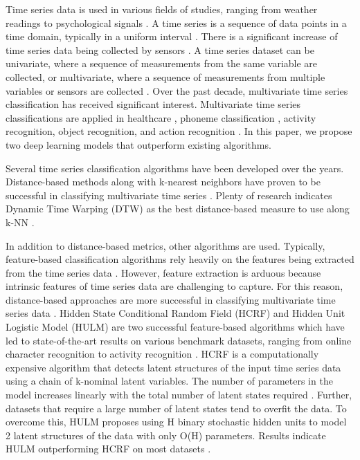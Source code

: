 \documentclass[preprint,12pt,3p]{elsarticle}
\begin{document}
Time series data is used in various fields of studies, ranging from weather readings to psychological signals \cite{kadous2002temporal,sharabiani2017efficient,kehagias1997predictive, cui2015complex}. A time series is a sequence of data points in a time domain, typically in a uniform interval \cite{wang2016effective}. There is a significant increase of time series data being collected by sensors \cite{spiegel2011pattern}. A time series dataset can be univariate, where a sequence of measurements from the same variable are collected, or multivariate, where a sequence of measurements from multiple variables or sensors are collected \cite{prieto2015stacking}. Over the past decade, multivariate time series classification has received significant interest. Multivariate time series classifications are applied in healthcare \cite{kang2014bayesian}, phoneme classification \cite{graves2005framewise}, activity recognition, object recognition, and action recognition \cite{fu2015human,geurts2001pattern,pavlovic1999time, yu2015real}. In this paper, we propose two deep learning models that outperform existing algorithms.

Several time series classification algorithms have been developed over the years. Distance-based methods along with k-nearest neighbors have proven to be successful in classifying multivariate time series \cite{orsenigo2010combining}. Plenty of research indicates Dynamic Time Warping (DTW) as the best distance-based measure to use along k-NN \cite{seto2015multivariate}. 

In addition to distance-based metrics, other  algorithms are used. Typically, feature-based classification algorithms rely heavily on the features being extracted from the time series data \cite{xing2010brief}. However, feature extraction is arduous because intrinsic features of time series data are challenging to capture. For this reason, distance-based approaches are more successful in classifying multivariate time series data \cite{zheng2014time}.  Hidden State Conditional Random Field (HCRF) and Hidden Unit Logistic Model (HULM) are two successful feature-based algorithms which have led to state-of-the-art results on various benchmark datasets, ranging from online character recognition to activity recognition \cite{pei2017multivariate}. HCRF is a computationally expensive algorithm that detects latent structures of the input time series data using a chain of k-nominal latent variables. The number of parameters in the model increases linearly with the total number of latent states required \cite{quattoni2007hidden}. Further, datasets that require a large number of latent states tend to overfit the data. To overcome this, HULM proposes using H binary stochastic hidden units to model 2 latent structures of the data with only O(H) parameters. Results indicate HULM outperforming HCRF on most datasets \cite{pei2017multivariate}.
\end{document}
